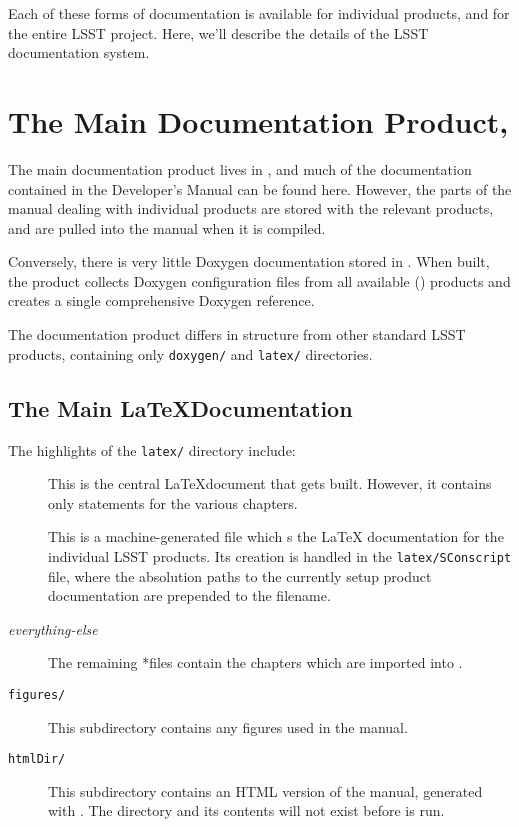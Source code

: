 Each of these forms of documentation is available for individual
products, and for the entire LSST project.  Here, we'll describe the
details of the LSST documentation system.


\section{The Main Documentation Product, \ttdevenvdoc\label{sec-maindoc}}

The main documentation product lives in \ttdevenvdoc, and much
of the documentation contained in the Developer's Manual can be found
here.  However, the parts of the manual dealing with individual
products are stored with the relevant products, and are pulled into
the manual when it is compiled.

Conversely, there is very little Doxygen documentation stored in
\ttdevenvdoc.  When built, the product collects Doxygen
configuration files from all available (\ttsetup) products and creates a
single comprehensive Doxygen reference.

The documentation product differs in structure from other standard
LSST products, containing only \texttt{doxygen/} and \texttt{latex/}
directories.

\subsection{The Main \LaTeX Documentation\label{sec-mainlatex}}

The highlights of the \texttt{latex/} directory include:

\begin{description}
  \item [\ttlsstmanual] This is the central \LaTeX document that gets
    built.  However, it contains only \ttinput
    statements for the various chapters.
  \item [\ttlsstpackages] This is a machine-generated file which
    \ttinput s the \LaTeX{} documentation for the
    individual LSST products.  Its creation is handled in the
    \texttt{latex/SConscript} file, where the absolution paths to the
    currently setup product documentation are prepended to the
    \ttinput filename.
  \item [{\itshape everything-else}\tttex] The remaining
    *\tttex files contain the chapters which are imported
    into \ttlsstmanual.
  \item[\texttt{figures/}] This subdirectory contains any figures
    used in the manual.
  \item[\texttt{htmlDir/}] This subdirectory contains an HTML
    version of the manual, generated with \ttlatextohtml.  The
    directory and its contents will not exist before \ttscons is
    run.
\end{description}


